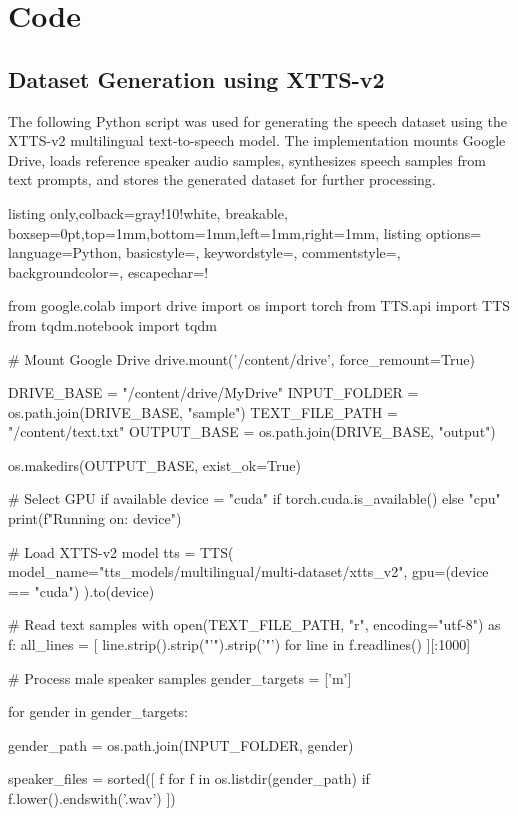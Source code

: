 \chapter{Code}

\section{Dataset Generation using XTTS-v2}

The following Python script was used for generating the speech dataset using the XTTS-v2 multilingual text-to-speech model. The implementation mounts Google Drive, loads reference speaker audio samples, synthesizes speech samples from text prompts, and stores the generated dataset for further processing.

\begin{tcblisting}{listing only,colback=gray!10!white, breakable, boxsep=0pt,top=1mm,bottom=1mm,left=1mm,right=1mm,
listing options={
language=Python,
basicstyle=\small\ttfamily,
keywordstyle=\color{blue},
commentstyle=\color{gray},
backgroundcolor=\color{gray!25},
escapechar=!}}

from google.colab import drive
import os
import torch
from TTS.api import TTS
from tqdm.notebook import tqdm

# Mount Google Drive
drive.mount('/content/drive', force_remount=True)

DRIVE_BASE = "/content/drive/MyDrive"
INPUT_FOLDER = os.path.join(DRIVE_BASE, "sample")
TEXT_FILE_PATH = "/content/text.txt"
OUTPUT_BASE = os.path.join(DRIVE_BASE, "output")

os.makedirs(OUTPUT_BASE, exist_ok=True)

# Select GPU if available
device = "cuda" if torch.cuda.is_available() else "cpu"
print(f"Running on: {device}")

# Load XTTS-v2 model
tts = TTS(
    model_name="tts_models/multilingual/multi-dataset/xtts_v2",
    gpu=(device == "cuda")
).to(device)

# Read text samples
with open(TEXT_FILE_PATH, "r", encoding="utf-8") as f:
    all_lines = [
        line.strip().strip("'").strip('"')
        for line in f.readlines()
    ][:1000]

# Process male speaker samples
gender_targets = ['m']

for gender in gender_targets:

    gender_path = os.path.join(INPUT_FOLDER, gender)

    speaker_files = sorted([
        f for f in os.listdir(gender_path)
        if f.lower().endswith('.wav')
    ])


\end{tcblisting}
